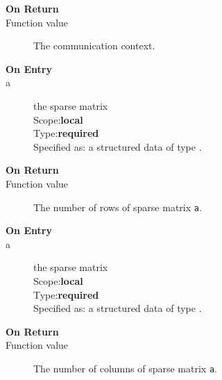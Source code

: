 \begin{description}
\item[\bf On Return]
\item[Function value] The communication context.
\end{description}





\begin{description}
\item[\bf On Entry]
\item[a] the sparse matrix\\
Scope:{\bf local}\\
Type:{\bf required}\\
Specified as: a structured data of type \spdata.
\end{description}

\begin{description}
\item[\bf On Return]
\item[Function value] The number of  rows  of sparse matrix \verb|a|.
\end{description}




\begin{description}
\item[\bf On Entry]
\item[a] the sparse matrix\\
Scope:{\bf local}\\
Type:{\bf required}\\
Specified as: a structured data of type \spdata.
\end{description}

\begin{description}
\item[\bf On Return]
\item[Function value] The number of  columns  of sparse matrix \verb|a|.
\end{description}




